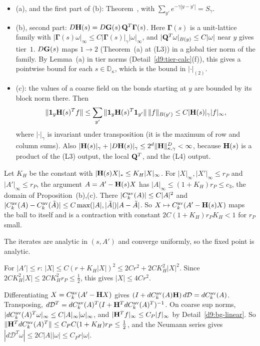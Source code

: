 \begin{detail}\label{d9:bg-linear}
\begin{itemize}
\item (a), and the first part of (b): Theorem~, with $\sum_{y'}e^{-\gamma|y-y'|}=S_\gamma$.
\item (b), second part: $D\mathbf H(s)=D\mathbf G(s)\,\mathbf Q^T\boldsymbol\Gamma(s)$. Here $\boldsymbol\Gamma(s)$ is a unit-lattice family with $|\boldsymbol\Gamma(s)\omega|_\infty\le C|\boldsymbol\Gamma(s)|_\gamma|\omega|_\infty$, and $|\mathbf Q^T\omega|_{B(y)}\le C|\omega|$ near $y$ gives tier~$1$. $D\mathbf G(s)$ maps $1\to2$ (Theorem~(a) at (L3)) in a global tier norm of the family. By Lemma~(a) in tier norms (Detail~\ref{d9:tier-calc}(f)), this gives a pointwise bound for each $s\in\mathbb D_\kappa$, which is the bound in $|\cdot|_{(2)}$.
\item (c): the values of a coarse field on the bonds starting at $y$ are bounded by its block norm there. Then
\[
\|\mathbf 1_y\mathbf H(s)^Tf\|\le\sum_{y'}\|\mathbf 1_y\mathbf H(s)^T\mathbf 1_{y'}\|\,\|f\|_{B(y')}\le C|\mathbf H(s)|_\gamma|f|_\infty ,
\]
where $|\cdot|_\gamma$ is invariant under transposition (it is the maximum of row and column sums). Also $|\mathbf H(s)|_\gamma+|D\mathbf H(s)|_\gamma\le2^d\|\mathbf H\|^D_{\kappa,\gamma}<\infty$, because $\mathbf H(s)$ is a product of the (L3) output, the local $\mathbf Q^T$, and the (L4) output.
\end{itemize}
\end{detail}

\begin{detail}\label{d9:Ds}
Let $K_H$ be the constant with $|\mathbf H(s)X|_*\le K_H|X|_\infty$. For $|X|_\infty,|X'|_\infty\le r_P$ and $|A'|_\infty\le r_P$, the argument $A=A'-\mathbf H(s)X$ has $|A|_\infty\le(1+K_H)r_P\le c_3$, the domain of Proposition~(b),(c). There $|C^{\rm av}_k(A)|\le C|A|^2$ and $|C^{\rm av}_k(A)-C^{\rm av}_k(\tilde A)|\le C\max(|A|,|\tilde A|)|A-\tilde A|$. So $X\mapsto C^{\rm av}_k(A'-\mathbf H(s)X)$ maps the ball to itself and is a contraction with constant $2C(1+K_H)r_PK_H<1$ for $r_P$ small.

The iterates are analytic in $(s,A')$ and converge uniformly, so the fixed point is analytic.

For $|A'|\le r$: $|X|\le C(r+K_H|X|)^2\le2Cr^2+2CK_H^2|X|^2$. Since $2CK_H^2|X|\le2CK_H^2r_P\le\frac12$, this gives $|X|\le4Cr^2$.

Differentiating $X=C^{\rm av}_k(A'-\mathbf H X)$ gives $(I+dC^{\rm av}_k(A)\mathbf H)\,d\mathcal D=dC^{\rm av}_k(A)$. Transposing, $d\mathcal D^T=dC^{\rm av}_k(A)^T(I+\mathbf H^TdC^{\rm av}_k(A)^T)^{-1}$. On coarse sup norms, $|dC^{\rm av}_k(A)^T\omega|_\infty\le C|A|_\infty|\omega|_\infty$, and $|\mathbf H^T f|_\infty\le C_P|f|_\infty$ by Detail~\ref{d9:bg-linear}. So $\|\mathbf H^TdC^{\rm av}_k(A)^T\|\le C_PC(1+K_H)r_P\le\frac12$, and the Neumann series gives $|d\mathcal D^T\omega|\le2C|A||\omega|\le C_Pr|\omega|$.
\end{detail}

